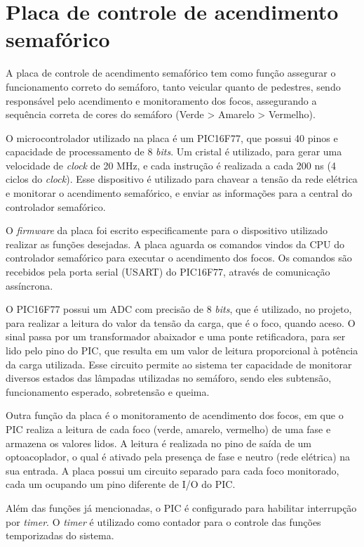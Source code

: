 \section{Placa de controle de acendimento semafórico}

A placa de controle de acendimento semafórico tem como função assegurar o funcionamento correto do semáforo, tanto veicular quanto de pedestres, sendo responsável pelo acendimento e monitoramento dos focos, assegurando a sequência correta de cores do semáforo (Verde > Amarelo > Vermelho)\cite{CET}.

O microcontrolador utilizado na placa é um PIC16F77, que possui 40 pinos e capacidade de processamento de 8 \textit{bits}. Um cristal é utilizado, para gerar uma velocidade de \textit{clock} de 20 MHz, e cada instrução é realizada a cada 200 ns (4 ciclos do \textit{clock}). Esse dispositivo é utilizado para chavear a tensão da rede elétrica e monitorar o acendimento semafórico, e enviar as informações para a central do controlador semafórico.

O \textit{firmware} da placa foi escrito especificamente para o dispositivo utilizado realizar as funções desejadas. A placa aguarda os comandos vindos da \ac{CPU} do controlador semafórico para executar o acendimento dos focos. Os comandos são recebidos pela porta serial (\ac{USART}) do PIC16F77, através de comunicação assíncrona.

O PIC16F77 possui um \ac{ADC} com precisão de 8 \textit{bits}, que é utilizado, no projeto, para realizar a leitura do valor da tensão da carga, que é o foco, quando aceso. O sinal passa por um transformador abaixador e uma ponte retificadora, para ser lido pelo pino do PIC, que resulta em um valor de leitura proporcional à potência da carga utilizada. Esse circuito permite ao sistema ter capacidade de monitorar diversos estados das lâmpadas utilizadas no semáforo, sendo eles subtensão, funcionamento esperado, sobretensão e queima.

Outra função da placa é o monitoramento de acendimento dos focos, em que o PIC realiza a leitura de cada foco (verde, amarelo, vermelho) de uma fase e armazena os valores lidos. A leitura é realizada no pino de saída de um optoacoplador, o qual é ativado pela presença de fase e neutro (rede elétrica) na sua entrada. A placa possui um circuito separado para cada foco monitorado, cada um ocupando um pino diferente de \ac{I/O} do PIC.

Além das funções já mencionadas, o PIC é configurado para habilitar interrupção por \textit{timer}. O \textit{timer} é utilizado como contador para o controle das funções temporizadas do sistema. 

